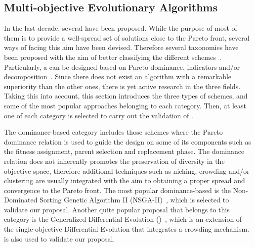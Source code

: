 \subsection{Multi-objective Evolutionary Algorithms}

In the last decade, several \MOEAS{} have been proposed. 
%
While the purpose of most of them is to provide a well-spread set of solutions close to the Pareto front,
several ways of facing this aim have been devised.
%
Therefore several taxonomies have been proposed with the aim of better classifying the different schemes~\cite{Joel:BOOK_MOEAs}.
%
Particularly, a \MOEA{} can be designed based on Pareto dominance, indicators and/or decomposition~\cite{Joel:StateArt}.
%
Since there does not exist an algorithm with a remarkable superiority than the other ones, there is yet active
research in the three fields.
%
Taking this into account, this section introduces the three types of schemes, and some of the most popular approaches belonging to each category.
%
Then, at least one \MOEA{} of each category is selected to carry out the validation of \VSDMOEA{}.

The dominance-based category includes those schemes where the Pareto dominance relation is used to guide the design on some of its components such as the
fitness assignment, parent selection and replacement phase.
%
The dominance relation does not inherently promotes the preservation of diversity in the objective space, therefore additional techniques such as niching, crowding and/or clustering 
are usually integrated with the aim to obtaining a proper spread and convergence to the Pareto front.
%
The most popular dominance-based \MOEA{} is the Non-Dominated Sorting Genetic Algorithm II (NSGA-II)~\cite{Joel:NSGAII}, which is selected to validate our proposal.
%
Another quite popular proposal that belongs to this category is the Generalized Differential Evolution (\GDEIII{})~\cite{Joel:GDE3}, which is an extension of the single-objective
Differential Evolution that integrates a crowding mechanism.
%
\GDEIII{} is also used to validate our proposal.

